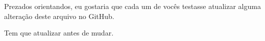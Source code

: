 \documentclass{article}
\begin{document}
Prezados orientandos,
eu gostaria que cada um de vocês testasse atualizar alguma alteração deste arquivo no GitHub.

Tem que atualizar antes de mudar.
\end{document}

